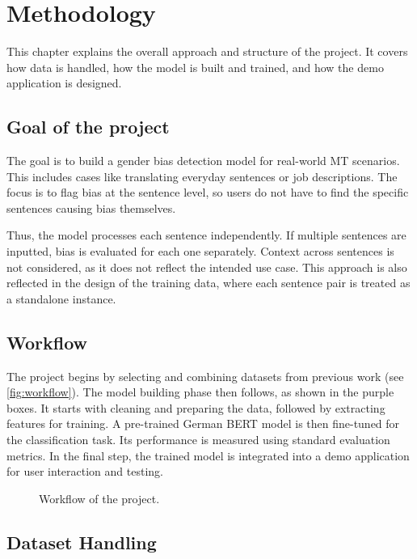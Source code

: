 \chapter{Methodology}
This chapter explains the overall approach and structure of the project. It covers how data is handled, how the model is built and trained, and how the demo application is designed.

\section{Goal of the project}
The goal is to build a gender bias detection model for real-world MT scenarios. This includes cases like translating everyday sentences or job descriptions. The focus is to flag bias at the sentence level, so users do not have to find the specific sentences causing bias themselves.

Thus, the model processes each sentence independently. If multiple sentences are inputted, bias is evaluated for each one separately. Context across sentences is not considered, as it does not reflect the intended use case. This approach is also reflected in the design of the training data, where each sentence pair is treated as a standalone instance.

\section{Workflow}
The project begins by selecting and combining datasets from previous work (see \autoref{fig:workflow}). The model building phase then follows, as shown in the purple boxes. It starts with cleaning and preparing the data, followed by extracting features for training. A pre-trained German BERT model is then fine-tuned for the classification task. Its performance is measured using standard evaluation metrics. In the final step, the trained model is integrated into a demo application for user interaction and testing.

\vspace{1cm} 
\begin{figure}[htb]
    \centering
    \scalebox{0.8}{}
    \caption{Workflow of the project.}
    \label{fig:workflow}
\end{figure}
\vspace{1cm} 

\section{Dataset Handling}

